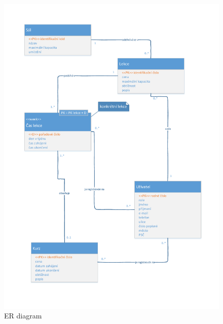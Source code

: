 \documentclass[12pt,a4paper]{report}
\begin{document}
	\begin{figure}[H]
		\centering
		\vspace{-5.5cm}
		\centerline{\includegraphics[width=1.32\linewidth]{er_diagram.pdf}}
		\caption{ER diagram}
		\label{erDiagram}
	\end{figure}
\end{document}
